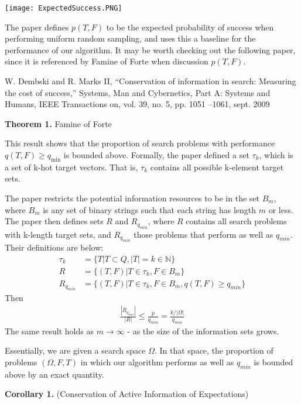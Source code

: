 \documentclass[12pt]{article}
\begin{document}
\begin{center}
    \texttt{[image: ExpectedSuccess.PNG]}
\end{center}

The paper defines $p(T,F)$ to be the expected probability of success when performing uniform random sampling, and uses this a baseline for the performance of our algorithm. It may be worth checking out the following paper, since it is referenced by Famine of Forte when discussion $p(T,F)$. 


W. Dembski and R. Marks II, “Conservation of information in search:
Measuring the cost of success,” Systems, Man and Cybernetics, Part A:
Systems and Humans, IEEE Transactions on, vol. 39, no. 5, pp. 1051
–1061, sept. 2009

\textbf{Theorem 1.} Famine of Forte

This result shows that the proportion of search problems with performance $q(T,F) \geq q_{\text{min}}$ is bounded above. Formally, the paper defined a set $\tau_k$, which is a set of k-hot target vectors. That is, $\tau_k$ contains all possible k-element target sets. 

The paper restricts the potential information resources to be in the set $B_m$, where $B_m$ is any set of binary strings such that each string has length $m$ or less. The paper then defines sets $R$ and $R_{q_{min}}$, where $R$ contains all search problems with k-length target sets, and $R_{q_{min}}$ those problems that perform as well as $q_{min}$. Their definitions are below: 
\begin{align*}
    \tau_k &= \{T | T \subset Q, |T| = k \in \mathds{N}\} \\ 
    R &= \{(T,F) | T \in \tau_k, F \in B_m\} \\
    R_{q_{min}} &= \{(T,F) | T \in \tau_k, F \in B_m, q(T,F) \geq q_{min}\}
\end{align*}
Then 
\begin{align*}
    \frac{|R_{q_{min}}|}{|R|} \leq \frac{p}{q_{min}} = \frac{k / |\Omega|}{q_{min}}
\end{align*}
The same result holds as $m \to \infty$ - as the size of the information sets grows.

Essentially, we are given a search space $\Omega$. In that space, the proportion of problems $(\Omega, F, T)$ in which our algorithm performs as well as $q_{min}$ is bounded above by an exact quantity. 

\bigskip 

\textbf{Corollary 1.} (Conservation of Active Information of Expectations)
\end{document}
